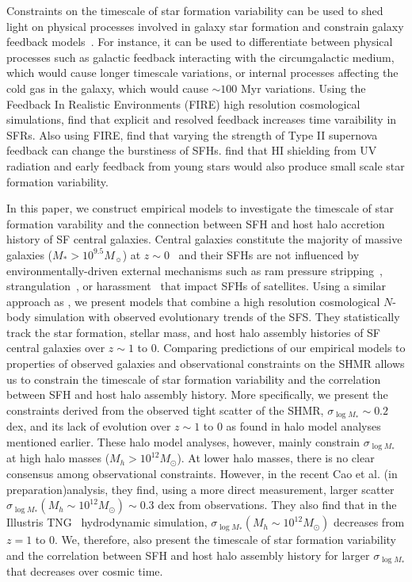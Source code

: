 \documentclass[12pt, letterpaper, preprint, tighten]{aastex62}
\newcommand{\edt}[1]{{\color{dred}{\bf} #1}}
\newcommand{\cao}{Cao et al. (in preparation)}
\newcommand{\siglogm}{\sigma_{\log M_*}}
\begin{document}
Constraints on the timescale of star formation variability can be used to
shed light on physical processes involved in galaxy star formation and
constrain galaxy feedback models~\citep{sparre2015}. For instance,
it can be used to differentiate between physical processes such
as galactic feedback interacting with the circumgalactic medium, which
would cause longer timescale variations, or internal processes affecting
the cold gas in the galaxy, which would cause $\sim 100$ Myr variations.
Using the Feedback In Realistic Environments (FIRE) high resolution
cosmological simulations, \cite{hopkins2014} find that
explicit and resolved feedback increases time varaibility in SFRs.
Also using FIRE, \cite{sparre2017} find that varying the strength of
Type II supernova feedback can change the burstiness of SFHs.
\cite{governato2015} find that HI shielding from UV radiation and
early feedback from young stars would also produce small scale star
formation variability.

\edt{In this paper, we construct empirical models to investigate the timescale
of star formation varability and the connection between SFH and host halo
accretion history of SF central galaxies. 
Central galaxies constitute the majority of massive galaxies ($M_*>10^{9.5}M_\sun$) 
at $z\sim0$~\citep{wetzel2013} and their SFHs are not influenced by 
environmentally-driven external mechanisms such as ram pressure 
stripping~\citep{gunn1972,bekki2009}, strangulation~\citep{larson1980, peng2015}, or 
harassment~\citep{moore1998} that impact SFHs of satellites. 
}
Using a similar approach as \cite{wetzel2013, hahn2017b}, we present models
that combine a high resolution cosmological $N$-body simulation with
observed evolutionary trends of the SFS. They statistically track the 
star formation, stellar mass, and host halo assembly histories of SF central 
galaxies over $z\sim1$ to $0$. Comparing predictions of our empirical models 
to properties of observed galaxies and observational constraints on the SHMR 
allows us to constrain the timescale of star formation variability and the 
correlation between SFH and host halo assembly history. 
\edt{More specifically, we present the constraints derived from the observed 
tight scatter of the SHMR, $\siglogm\sim0.2$ dex, and its lack of evolution 
over $z\sim1$ to $0$ as found in halo model analyses mentioned earlier. These 
halo model analyses, however, mainly constrain $\siglogm$ at high halo masses 
($M_h > 10^{12}M_\odot$). At lower halo masses, there is no clear consensus 
among observational constraints. However, in the recent \cao analysis, they find, 
using a more direct measurement, larger scatter $\siglogm(M_h\sim 10^{12} M_\odot) \sim 0.3$ 
dex from observations. They also find that in the Illustris TNG~\citep{pillepich2018} 
hydrodynamic simulation, $\siglogm(M_h\sim 10^{12} M_\odot)$ decreases from 
$z=1$ to $0$. We, therefore, also present the timescale of star formation variability 
and the correlation between SFH and host halo assembly history for larger 
$\siglogm$ that decreases over cosmic time. 
}
\end{document}
